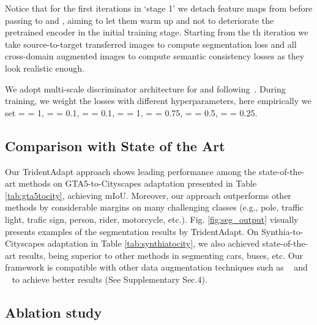 \documentclass{bmvc2k}
\newcommand{\Fig}[1]{Fig. \ref{fig:#1}}
\newcommand{\Tab}[1]{Table \ref{tab:#1}}
\begin{document}
Notice that for the first  iterations in `stage {1}' we detach feature maps from  before passing to  and , aiming to let them warm up and not to deteriorate the pretrained encoder  in the initial training stage. Starting from the th iteration we take source-to-target transferred images to compute segmentation loss and all cross-domain augmented images to compute semantic consistency losses as they look realistic enough. 

We adopt multi-scale discriminator architecture for  and  following~\cite{huang2018multimodal}.
During training, we weight the losses with different hyperparameters, here empirically we set  =   = 1,   =  = 0.1,   =  = 0.1,   =  = 1,  =  = 0.75,  =  = 0.5,  =  = 0.25.



\subsection{Comparison with State of the Art}

Our TridentAdapt approach shows leading performance among the state-of-the-art methods on GTA5-to-Cityscapes adaptation presented in \Tab{gta5tocity}, achieving  mIoU. Moreover, our approach outperforms other methods by considerable margins on many challenging classes (e.g., pole, traffic light, trafic sign, person, rider, motorcycle, etc.). \Fig{seg_output} visually presents examples of the segmentation results by  TridentAdapt. On Synthia-to-Cityscapes adaptation in \Tab{synthiatocity}, we also achieved state-of-the-art results, being superior to other methods in segmenting cars, buses, etc. Our framework is compatible with other data augmentation techniques such as ~\cite{yun2019cutmix} and ~\cite{olsson2021classmix} to achieve better results (See Supplementary Sec.4).




\subsection{Ablation study}
\end{document}
